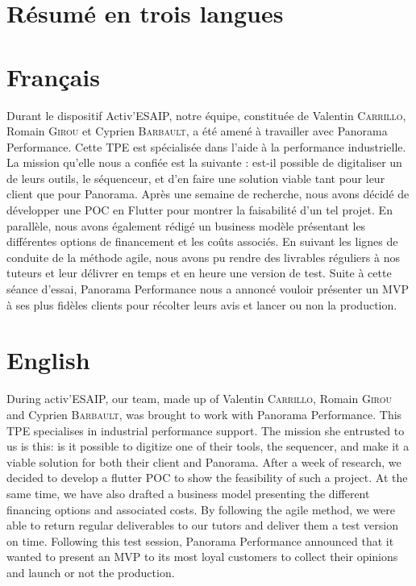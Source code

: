 
\section{Résumé en trois langues}
\section*{Français}

Durant le dispositif Activ'ESAIP, notre équipe, constituée de Valentin \textsc{Carrillo}, Romain \textsc{Girou} et Cyprien \textsc{Barbault}, a été amené à travailler avec Panorama Performance. Cette TPE est spécialisée dans l'aide à la performance industrielle. La mission qu'elle nous a confiée est la suivante : est-il possible de digitaliser un de leurs outils, le séquenceur, et d'en faire une solution viable tant pour leur client que pour Panorama. Après une semaine de recherche, nous avons décidé de développer une POC en Flutter pour montrer la faisabilité d'un tel projet. En parallèle, nous avons également rédigé un business modèle présentant les différentes options de financement et les coûts associés. En suivant les lignes de conduite de la méthode agile, nous avons pu rendre des livrables réguliers à nos tuteurs et leur délivrer en temps et en heure une version de test. Suite à cette séance d'essai, Panorama Performance nous a annoncé vouloir présenter un MVP à ses plus fidèles clients pour récolter leurs avis et lancer ou non la production.

\section*{English}

During activ'ESAIP, our team, made up of Valentin \textsc{Carrillo}, Romain \textsc{Girou} and Cyprien \textsc{Barbault}, was brought to work with Panorama Performance. This TPE specialises in industrial performance support. The mission she entrusted to us is this: is it possible to digitize one of their tools, the sequencer, and make it a viable solution for both their client and Panorama. After a week of research, we decided to develop a flutter POC to show the feasibility of such a project. At the same time, we have also drafted a business model presenting the different financing options and associated costs. By following the agile method, we were able to return regular deliverables to our tutors and deliver them a test version on time. Following this test session, Panorama Performance announced that it wanted to present an MVP to its most loyal customers to collect their opinions and launch or not the production.

